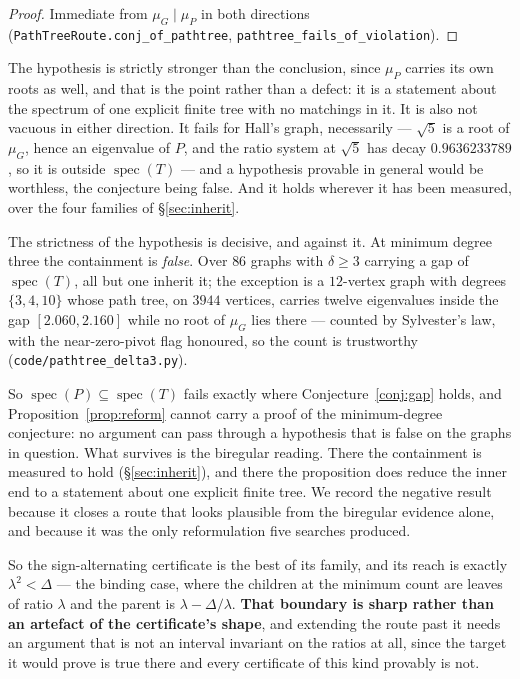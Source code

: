\documentclass[11pt]{article}
\theoremstyle{remark}
\begin{document}
\begin{proof}
Immediate from $\mu_G\mid\mu_P$ in both directions
(\texttt{PathTreeRoute.conj\_of\_pathtree}, \texttt{pathtree\_fails\_of\_violation}).
\end{proof}

The hypothesis is strictly stronger than the conclusion, since $\mu_P$ carries its own roots as
well, and that is the point rather than a defect: it is a statement about the spectrum of one
explicit finite tree with no matchings in it. It is also not vacuous in either direction. It fails
for Hall's graph, necessarily --- $\sqrt5$ is a root of $\mu_G$, hence an eigenvalue of $P$, and
the ratio system at $\sqrt5$ has decay $0.9636233789$, so it is outside $\operatorname{spec}(T)$
--- and a hypothesis provable in general would be worthless, the conjecture being false. And it
holds wherever it has been measured, over the four families of \S\ref{sec:inherit}.

The strictness of the hypothesis is decisive, and against it. At minimum degree three the
containment is \emph{false}. Over $86$ graphs with $\delta\ge3$ carrying a gap of
$\operatorname{spec}(T)$, all but one inherit it; the exception is a $12$-vertex graph with
degrees $\{3,4,10\}$ whose path tree, on $3944$ vertices, carries twelve eigenvalues inside the
gap $[2.060,2.160]$ while no root of $\mu_G$ lies there --- counted by Sylvester's law, with the
near-zero-pivot flag honoured, so the count is trustworthy
(\texttt{code/pathtree\_delta3.py}).

So $\operatorname{spec}(P)\subseteq\operatorname{spec}(T)$ fails exactly where
Conjecture~\ref{conj:gap} holds, and Proposition~\ref{prop:reform} cannot carry a proof of the
minimum-degree conjecture: no argument can pass through a hypothesis that is false on the graphs
in question. What survives is the biregular reading. There the containment is measured to hold
(\S\ref{sec:inherit}), and there the proposition does reduce the inner end to a statement about
one explicit finite tree. We record the negative result because it closes a route that looks
plausible from the biregular evidence alone, and because it was the only reformulation five
searches produced.

So the sign-alternating certificate is the best of its family, and its reach is exactly
$\lambda^2<\Delta$ --- the binding case, where the children at the minimum count are leaves of
ratio $\lambda$ and the parent is $\lambda-\Delta/\lambda$. \textbf{That boundary is sharp rather
than an artefact of the certificate's shape}, and extending the route past it needs an argument
that is not an interval invariant on the ratios at all, since the target it would prove is true
there and every certificate of this kind provably is not.
\end{document}
